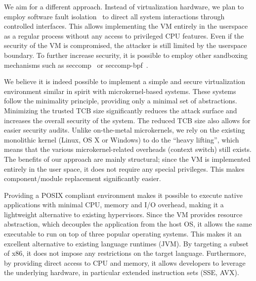 We aim for a different approach. Instead of virtualization hardware, we
plan to employ software fault isolation~\cite{wahbe:sosp93} to direct
all system interactions through controlled interfaces. This allows
implementing the VM entirely in the userspace as a regular process
without any access to privileged CPU features. Even if the security of
the VM is compromised, the attacker is still limited by the userspace
boundary. To further increase security, it is possible to employ other
sandboxing mechanisms such as seccomp~\cite{seccomp} or
seccomp-bpf~\cite{seccomp-bpf}.

We believe it is indeed possible to implement a simple and secure
virtualization environment similar in spirit with microkernel-based
systems. These systems follow the minimality principle, providing only a
minimal set of abstractions. Minimizing the trusted TCB size
significantly reduces the attack surface and increases the overall
security of the system. The reduced TCB size also allows for easier
security audits. Unlike on-the-metal microkernels, we rely on the
existing monolithic kernel (\ie Linux, OS X or Windows) to do the
``heavy lifting'', which means that the various microkernel-related
overheads (\eg context switch) still exists.   The benefits of our approach are mainly structural; since the
VM is implemented entirely in the user space, it does not require any
special privileges. This makes component/module replacement
significantly easier.

Providing a POSIX compliant environment makes it possible to execute
native applications with minimal CPU, memory and I/O overhead,
making it a lightweight alternative to existing hypervisors.  Since the
VM provides resource abstraction, which decouples the application from the
host OS, it allows the same executable to run on top of three popular
operating systems. This makes it an excellent alternative to existing
language runtimes (\eg JVM). By targeting a subset of x86, it does not
impose any restrictions on the target language.  Furthermore, by
providing direct access to CPU and memory, it allows developers to
leverage the underlying hardware, in particular extended instruction
sets (\eg SSE, AVX).


